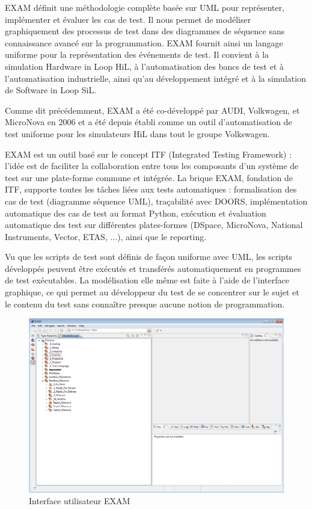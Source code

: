 EXAM définit une méthodologie complète basée sur UML pour représenter, implémenter et évaluer les cas de test. Il nous permet de modéliser graphiquement des processus de test dans des diagrammes de séquence sans connaissance avancé sur la programmation. EXAM fournit ainsi un langage uniforme pour la représentation des événements de test. Il convient à la simulation Hardware in Loop HiL, à l'automatisation des bancs de test et à l'automatisation industrielle, ainsi qu'au développement intégré et à la simulation de Software in Loop SiL.

Comme dit précédemment, EXAM a été co-développé par AUDI, Volkwagen, et MicroNova en 2006 et a été depuis établi comme un outil d'automatisation de test uniforme pour les simulateurs HiL dans tout le groupe Volkswagen.

EXAM est un outil basé sur le concept ITF (Integrated Testing Framework) : l'idée est de faciliter la collaboration entre tous les composants d'un système de test sur une plate-forme commune et intégrée. La brique EXAM, fondation de ITF, supporte toutes les tâches liées aux tests automatiques : formalisation des cas de test (diagramme séquence UML), traçabilité avec DOORS, implémentation automatique des cas de test au format Python, exécution et évaluation automatique des test sur différentes plates-formes (DSpace, MicroNova, National Instruments, Vector, ETAS, ...), ainsi que le reporting.

Vu que les scripts de test sont définis de façon uniforme avec UML, les scripts développés peuvent être exécutés et transférés automatiquement en programmes de test exécutables. La modélisation elle même est faite à l'aide de l'interface graphique, ce qui permet au développeur du test de se concentrer sur le sujet et le contenu du test sans connaître presque aucune notion de programmation.

\begin{figure}[H]
 \centering
 \includegraphics[scale=0.45]{images/exam_ui}
 \caption{Interface utilisateur EXAM}
\end{figure}

